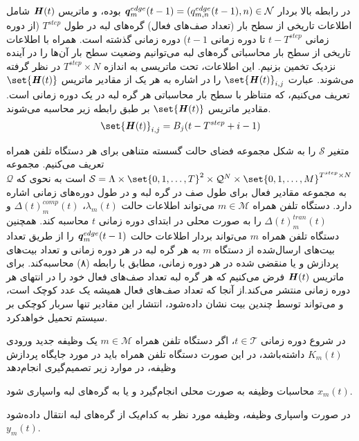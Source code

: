 در رابطه بالا بردار $\textbf{\textit{q}}_m^{edge}(t-1) = (q_{m,n}^{edge}(t-1), n) \in \mathcal{N}$ بوده، و ماتریس $\textbf{\textit{H}}(t)$ شامل اطلاعات تاریخی از سطح بار (تعداد صف‌های فعال) گره‌های لبه در طول $T^{step}$ (از دوره زمانی $t-T^{step}$ تا دوره زمانی $t-1$) دوره زمانی گذشته است. همراه با اطلاعات تاریخی از سطح بار محاسباتی گره‌های لبه می‌توانیم وضعیت سطح بار آن‌ها را در آینده نزدیک تخمین بزنیم. این اطلاعات، تحت ماتریسی به اندازه $T^{step} \times N$ در نظر گرفته می‌شوند. عبارت $\set{\textbf{\textit{H}}(t)}_{i,j}$ را در اشاره به هر یک از مقادیر ماتریس $\set{\textbf{\textit{H}}(t)}$ تعریف می‌کنیم، که متناظر با سطح بار محاسباتی هر گره لبه در یک دوره زمانی است. مقادیر ماتریس $\set{\textbf{\textit{H}}(t)}$ بر طبق رابطه زیر محاسبه می‌شوند.
\begin{alignat}{2}
	\set{\textbf{\textit{H}}(t)}_{i,j} = B_j(t - T^{step} + i -1)
	\label{13}  
\end{alignat}


متغیر $\mathcal{S}$ را به شکل مجموعه فضای حالت گسسته متناهی برای هر دستگاه تلفن همراه تعریف می‌کنیم. مجموعه $\mathcal{S} = \Lambda \times \set{0,1,\ldots,T}^2 \times \mathcal{Q}^N \times \set{0,1,\ldots,M}^{T^{step} \times N}$ است به نحوی که $\mathcal{Q}$ به مجموعه مقادیر فعال برای طول صف در گره لبه و در طول دوره‌های زمانی اشاره دارد. 
دستگاه تلفن همراه $m \in \mathcal{M}$ می‌تواند اطلاعات حالت $\lambda_m(t)$، $\Delta(t)_m^{comp}(t)$ و $\Delta(t)_m^{tran}(t)$ را به صورت محلی در ابتدای دوره زمانی $t$ محاسبه کند. همچنین دستگاه تلفن همراه $m$ می‌تواند بردار اطلاعات حالت $\textbf{\textit{q}}_m^{edge}(t-1)$ را از طریق تعداد بیت‌های ارسال‌شده از دستگاه $m$ به هر گره لبه در هر دوره زمانی و تعداد بیت‌های پردازش و یا منقضی شده در هر دوره زمانی، مطابق با رابطه (۸) محاسبه‌کند. برای ماتریس $\textbf{\textit{H}}(t)$ فرض می‌کنیم که هر گره لبه تعداد صف‌های فعال خود را در انتهای هر دوره زمانی منتشر می‌کند.از آنجا که تعداد صف‌های فعال همیشه یک عدد کوچک است، و می‌تواند توسط چندین بیت نشان داده‌شود، انتشار این مقادیر تنها  سربار کوچکی بر سیستم تحمیل خواهدکرد.


در شروع دوره زمانی $t \in \mathcal{T}$، اگر دستگاه تلفن همراه $m \in \mathcal{M}$ یک وظیفه جدید ورودی $K_m(t)$ داشته‌باشد، در این صورت دستگاه تلفن همراه باید در مورد جایگاه پردازش وظیفه، در موارد زیر تصمیم‌گیری انجام‌دهد

  محاسبات وظیفه به صورت محلی انجام‌گیرد و یا به گره‌های لبه واسپاری شود $x_m(t)$.

 در صورت واسپاری وظیفه، وظیفه مورد نظر به کدام‌یک از گره‌های لبه انتقال داده‌شود $y_m(t)$.


